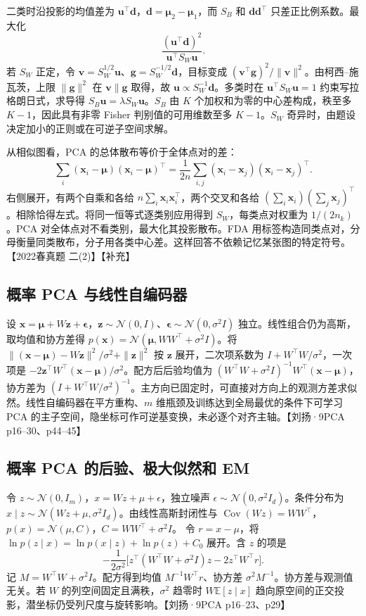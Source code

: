 \documentclass[UTF8,a4paper,zihao=-4,fontset=fandol]{ctexrep}
\begin{document}
二类时沿投影的均值差为 \(\bm u^\top\bm d\)，\(\bm d=\bm\mu_2-\bm\mu_1\)，而 \(S_B\) 和 \(\bm d\bm d^\top\) 只差正比例系数。最大化
\[
 \frac{(\bm u^\top\bm d)^2}{\bm u^\top S_W\bm u}.
\]
若 \(S_W\) 正定，令 \(\bm v=S_W^{1/2}\bm u\)、\(\bm g=S_W^{-1/2}\bm d\)，目标变成 \((\bm v^\top\bm g)^2/\|\bm v\|^2\)。由柯西--施瓦茨，上限 \(\|\bm g\|^2\) 在 \(\bm v\parallel\bm g\) 取得，故 \(\bm u\propto S_W^{-1}\bm d\)。多类时在 \(\bm u^\top S_W\bm u=1\) 约束写拉格朗日式，求导得 \(S_B\bm u=\lambda S_W\bm u\)。\(S_B\) 由 \(K\) 个加权和为零的中心差构成，秩至多 \(K-1\)，因此具有非零 Fisher 判别值的可用维数至多 \(K-1\)。\(S_W\) 奇异时，由题设决定加小的正则或在可逆子空间求解。

从相似图看，PCA 的总体散布等价于全体点对的差：
\[
 \sum_i(\bm x_i-\bm\mu)(\bm x_i-\bm\mu)^\top
 =\frac1{2n}\sum_{i,j}(\bm x_i-\bm x_j)(\bm x_i-\bm x_j)^\top .
\]
右侧展开，有两个自乘和各给 \(n\sum_i\bm x_i\bm x_i^\top\)，两个交叉和各给 \((\sum_i\bm x_i)(\sum_j\bm x_j)^\top\)。相除恰得左式。将同一恒等式逐类别应用得到 \(S_W\)，每类点对权重为 \(1/(2n_k)\)。PCA 对全体点对不看类别，最大化其投影散布。FDA 用标签构造同类点对，分母衡量同类散布，分子用各类中心差。这样回答不依赖记忆某张图的特定符号。【2022春真题 二(2)】【补充】

\subsection*{概率 PCA 与线性自编码器}
设 \(\bm x=\bm\mu+W\bm z+\bm\epsilon\)，\(\bm z\sim\mathcal N(0,I)\)、\(\bm\epsilon\sim\mathcal N(0,\sigma^2I)\) 独立。线性组合仍为高斯，取均值和协方差得 \(p(\bm x)=\mathcal N(\bm\mu,WW^\top+\sigma^2I)\)。将 \(\|(\bm x-\bm\mu)-W\bm z\|^2/\sigma^2+\|\bm z\|^2\) 按 \(\bm z\) 展开，二次项系数为 \(I+W^\top W/\sigma^2\)，一次项是 \(-2\bm z^\top W^\top(\bm x-\bm\mu)/\sigma^2\)。配方后后验均值为 \((W^\top W+\sigma^2I)^{-1}W^\top(\bm x-\bm\mu)\)，协方差为 \((I+W^\top W/\sigma^2)^{-1}\)。主方向已固定时，可直接对方向上的观测方差求似然。线性自编码器在平方重构、\(m\) 维瓶颈及训练达到全局最优的条件下可学习 PCA 的主子空间，隐坐标可作可逆基变换，未必逐个对齐主轴。【刘扬·9PCA p16--30、p44--45】

\subsection*{概率 PCA 的后验、极大似然和 EM}
令 $z\sim\mathcal N(0,I_m)$，$x=Wz+\mu+\epsilon$，独立噪声 $\epsilon\sim\mathcal N(0,\sigma^2I_d)$。条件分布为 $x\mid z\sim\mathcal N(Wz+\mu,\sigma^2I_d)$。由线性高斯封闭性与 $\operatorname{Cov}(Wz)=WW^\top$，
$p(x)=\mathcal N(\mu,C)$，$C=WW^\top+\sigma^2I$。
令 $r=x-\mu$，将 $\ln p(z\mid x)=\ln p(x\mid z)+\ln p(z)+C_0$ 展开。含 $z$ 的项是
\[
-\frac{1}{2\sigma^2}
\bigl[z^\top(W^\top W+\sigma^2I)z-2z^\top W^\top r\bigr].
\]
记 $M=W^\top W+\sigma^2 I$。配方得到均值 $M^{-1}W^\top r$、协方差 $\sigma^2M^{-1}$。协方差与观测值无关。若 $W$ 的列空间固定且满秩，$\sigma^2$ 趋零时 $W\mathbb E[z\mid x]$ 趋向原空间的正交投影，潜坐标仍受列尺度与旋转影响。【刘扬·9PCA p16–23、p29】
\end{document}
